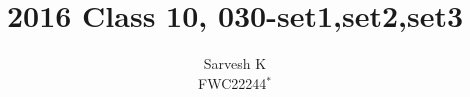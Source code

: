 \documentclass[book,11pt,onecolumn]{IEEEtran}
\DeclareMathOperator*{\Res}{Res}
\begin{document}
\newtheorem{theorem}{Theorem}[section]
\newtheorem{problem}{Problem}
\newtheorem{proposition}{Proposition}[section]
\newtheorem{lemma}{Lemma}[section]
\newtheorem{corollary}[theorem]{Corollary}
\newtheorem{example}{Example}[section]
\newtheorem{definition}[problem]{Definition}
\newcommand{\BEQA}{\begin{eqnarray}}
\newcommand{\EEQA}{\end{eqnarray}}
\newcommand{\define}{\stackrel{\triangle}{=}}

\providecommand{\mbf}{\mathbf}
\providecommand{\pr}[1]{\ensuremath{\Pr\left(#1\right)}}
\providecommand{\qfunc}[1]{\ensuremath{Q\left(#1\right)}}
\providecommand{\sbrak}[1]{\ensuremath{{}\left[#1\right]}}
\providecommand{\lsbrak}[1]{\ensuremath{{}\left[#1\right.}}
\providecommand{\rsbrak}[1]{\ensuremath{{}\left.#1\right]}}
\providecommand{\brak}[1]{\ensuremath{\left(#1\right)}}
\providecommand{\lbrak}[1]{\ensuremath{\left(#1\right.}}
\providecommand{\rbrak}[1]{\ensuremath{\left.#1\right)}}
\providecommand{\cbrak}[1]{\ensuremath{\left\{#1\right\}}}
\providecommand{\lcbrak}[1]{\ensuremath{\left\{#1\right.}}
\providecommand{\rcbrak}[1]{\ensuremath{\left.#1\right\}}}
\theoremstyle{remark}
\newtheorem{rem}{Remark}
\newcommand{\sgn}{\mathop{\mathrm{sgn}}}
\providecommand{\abs}[1]{\left\vert#1\right\vert}
\providecommand{\res}[1]{\Res\displaylimits_{#1}} 
\providecommand{\norm}[1]{\left\lVert#1\right\rVert}
\providecommand{\mtx}[1]{\mathbf{#1}}
\providecommand{\mean}[1]{E\left[ #1 \right]}
\providecommand{\fourier}{\overset{\mathcal{F}}{ \rightleftharpoons}}
\providecommand{\system}[1]{\overset{\mathcal{#1}}{ \longleftrightarrow}}
\newcommand{\solution}{\noindent \textbf{Solution: }}
\newcommand{\cosec}{\,\text{cosec}\,}
\providecommand{\dec}[2]{\ensuremath{\overset{#1}{\underset{#2}{\gtrless}}}}
\newcommand{\myvec}[1]{\ensuremath{\begin{pmatrix}#1\end{pmatrix}}}
\newcommand{\mydet}[1]{\ensuremath{\begin{vmatrix}#1\end{vmatrix}}}
\let\vec\mathbf
\def\putbox#1#2#3{\makebox[0in][l]{\makebox[#1][l]{}\raisebox{\baselineskip}[0in][0in]{\raisebox{#2}[0in][0in]{#3}}}}
     \def\rightbox#1{\makebox[0in][r]{#1}}
     \def\centbox#1{\makebox[0in]{#1}}
     \def\topbox#1{\raisebox{-\baselineskip}[0in][0in]{#1}}
     \def\midbox#1{\raisebox{-0.5\baselineskip}[0in][0in]{#1}}

\vspace{3cm}
\title{
2016 Class 10, 030-set1,set2,set3
}
\author{ Sarvesh K\\FWC22244$^{*}$%
	
}	
\end{document}
